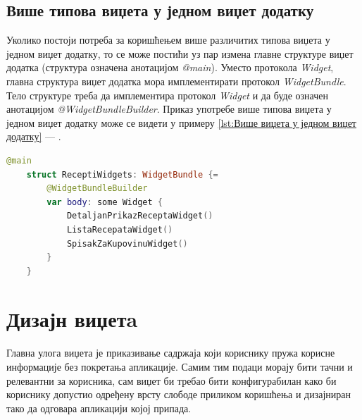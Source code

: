 \documentclass[12pt,oneside]{memoir}
\begin{document}
\subsection{Више типова виџета у једном виџет додатку}
\indent Уколико постоји потреба за коришћењем више различитих типова виџета у једном виџет додатку, то се може постићи уз пар измена главне структуре виџет додатка (структура означена анотацијом \textit{@main}). Уместо протокола \textit{Widget}, главна структура виџет додатка мора имплементирати протокол \textit{WidgetBundle}. Тело структуре треба да имплементира протокол \textit{Widget} и да буде означен анотацијом \textit{@WidgetBundleBuilder}. Приказ употребе више типова виџета у једном виџет додатку може се видети у примеру \ref{lst:Више виџета у једном виџет додатку} --- .

\begin{lstlisting}[caption=\textit{{Више виџета у једном виџет додатку}}, label={lst:Више виџета у једном виџет додатку}, language=Swift, frame=single]
    @main
    struct ReceptiWidgets: WidgetBundle {=
        @WidgetBundleBuilder
        var body: some Widget {
            DetaljanPrikazReceptaWidget()
            ListaRecepataWidget()
            SpisakZaKupovinuWidget()
        }
    }
\end{lstlisting}

\section{Дизајн виџетa}
\label{sec:Дизајн виџетa}

\indent Главна улога виџета је приказивање садржаја који кориснику пружа корисне информације без покретања апликације. Самим тим подаци морају бити тачни и релевантни за корисника, сам виџет би требао бити конфигурабилан како би кориснику допустио одређену врсту слободе приликом коришћења и дизајниран тако да одговара апликацији којој припада.
\end{document}
